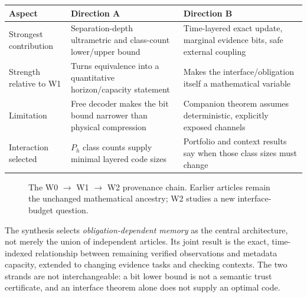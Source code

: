 \documentclass[11pt,letterpaper]{article}
\begin{document}
\begin{center}\small
\begin{tabularx}{\textwidth}{@{}p{22mm}X X@{}}\toprule
Aspect & Direction A & Direction B\\\midrule
Strongest contribution & Separation-depth ultrametric and class-count lower/upper bound & Time-layered exact update, marginal evidence bits, safe external coupling\\
Strength relative to W1 & Turns equivalence into a quantitative horizon/capacity statement & Makes the interface/obligation itself a mathematical variable\\
Limitation & Free decoder makes the bit bound narrower than physical compression & Companion theorem assumes deterministic, explicitly exposed channels\\
Interaction selected & $P_h$ class counts supply minimal layered code sizes & Portfolio and context results say when those class sizes must change\\\bottomrule
\end{tabularx}
\end{center}
\begin{figure}[htbp]\centering
{}
\caption{The W0 $\to$ W1 $\to$ W2 provenance chain. Earlier articles remain the unchanged mathematical ancestry; W2 studies a new interface-budget question.}
\end{figure}
The synthesis selects \emph{obligation-dependent memory} as the central architecture, not merely the union of independent articles. Its joint result is the exact, time-indexed relationship between remaining verified observations and metadata capacity, extended to changing evidence tasks and checking contexts. The two strands are not interchangeable: a bit lower bound is not a semantic trust certificate, and an interface theorem alone does not supply an optimal code.
\end{document}
